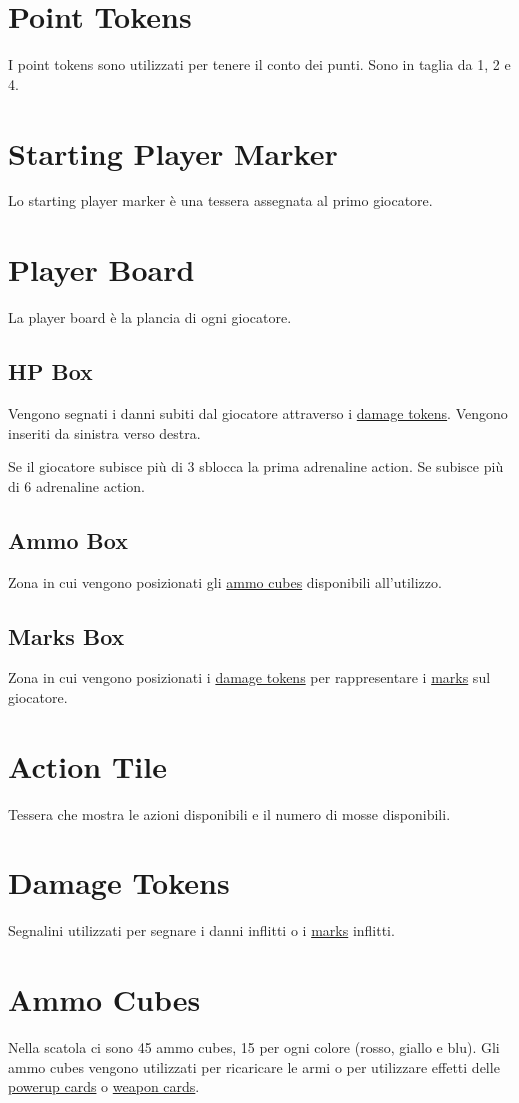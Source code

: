 \documentclass[a4paper, 12pt]{article}
\begin{document}
\section{Point Tokens} \label{sec:point-tokens}
	I point tokens sono utilizzati per tenere il conto dei punti. Sono in taglia da 1, 2 e 4.
\section{Starting Player Marker} \label{sec:starting-player-marker}
	Lo starting player marker è una tessera assegnata al primo giocatore.
\section{Player Board} \label{sec:player-board}
	La player board è la plancia di ogni giocatore.
	\subsection{HP Box} \label{sec:hp-box}
		Vengono segnati i danni subiti dal giocatore attraverso i \hyperref[sec:damage-tokens]{damage tokens}. Vengono inseriti da sinistra verso destra.
		
		Se il giocatore subisce più di 3 sblocca la prima adrenaline action. 
		Se subisce più di 6 adrenaline action.
	\subsection{Ammo Box} \label{sec:ammo-box}
		Zona in cui vengono posizionati gli \hyperref[sec:ammo-cubes]{ammo cubes} disponibili all'utilizzo.
	\subsection{Marks Box} \label{sec:marks-box}
		Zona in cui vengono posizionati i \hyperref[sec:damage-tokens]{damage tokens} per rappresentare i \hyperref[sec:mark]{marks} sul giocatore.
\section{Action Tile} \label{sec:action-tile}
	Tessera che mostra le azioni disponibili e il numero di mosse disponibili.
\section{Damage Tokens} \label{sec:damage-tokens}
	Segnalini utilizzati per segnare i danni inflitti o i \hyperref[sec:mark]{marks} inflitti.
\section{Ammo Cubes} \label{sec:ammo-cubes}
	Nella scatola ci sono 45 ammo cubes, 15 per ogni colore (rosso, giallo e blu).
	Gli ammo cubes vengono utilizzati per ricaricare le armi o per utilizzare effetti delle \hyperref[sec:powerup-cards]{powerup cards} o \hyperref[sec:weapon-cards]{weapon cards}.
	
\end{document}
